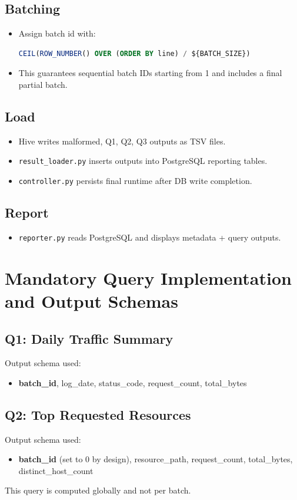 \documentclass[12pt,a4paper]{article}
\begin{document}
\subsection{Batching}
\begin{itemize}
    \item Assign batch id with:
\begin{lstlisting}[language=SQL]
CEIL(ROW_NUMBER() OVER (ORDER BY line) / ${BATCH_SIZE})
\end{lstlisting}
    \item This guarantees sequential batch IDs starting from 1 and includes a final partial batch.
\end{itemize}

\subsection{Load}
\begin{itemize}
    \item Hive writes malformed, Q1, Q2, Q3 outputs as TSV files.
    \item \texttt{result\_loader.py} inserts outputs into PostgreSQL reporting tables.
    \item \texttt{controller.py} persists final runtime after DB write completion.
\end{itemize}

\subsection{Report}
\begin{itemize}
    \item \texttt{reporter.py} reads PostgreSQL and displays metadata + query outputs.
\end{itemize}

\section{Mandatory Query Implementation and Output Schemas}
\subsection{Q1: Daily Traffic Summary}
Output schema used:
\begin{itemize}
    \item \textbf{batch\_id}, log\_date, status\_code, request\_count, total\_bytes
\end{itemize}

\subsection{Q2: Top Requested Resources}
Output schema used:
\begin{itemize}
    \item \textbf{batch\_id} (set to 0 by design), resource\_path, request\_count, total\_bytes, distinct\_host\_count
\end{itemize}
This query is computed globally and not per batch.
\end{document}
